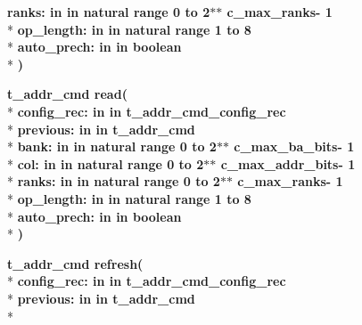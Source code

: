 \begin{DoxyCompactItemize}
{\bfseries \textcolor{vhdlchar}{ranks\+: }\textcolor{stringliteral}{in }\textcolor{vhdlchar}{in natural   range  0 to  2$\ast$$\ast$   c\+\_\+max\+\_\+ranks-\/ 1}}\\*
{\bfseries \textcolor{vhdlchar}{op\+\_\+length\+: }\textcolor{stringliteral}{in }\textcolor{vhdlchar}{in natural   range  1 to  8}}\\*
{\bfseries \textcolor{vhdlchar}{auto\+\_\+prech\+: }\textcolor{stringliteral}{in }\textcolor{vhdlchar}{in boolean}}\\*
{\bfseries  )} 
\item 
{\bfseries {\bfseries \textcolor{vhdlchar}{t\+\_\+addr\+\_\+cmd}\textcolor{vhdlchar}{ }}} {\bf read}{\bfseries  ( }\\*
{\bfseries \textcolor{vhdlchar}{config\+\_\+rec\+: }\textcolor{stringliteral}{in }\textcolor{vhdlchar}{in t\+\_\+addr\+\_\+cmd\+\_\+config\+\_\+rec}}\\*
{\bfseries \textcolor{vhdlchar}{previous\+: }\textcolor{stringliteral}{in }\textcolor{vhdlchar}{in t\+\_\+addr\+\_\+cmd}}\\*
{\bfseries \textcolor{vhdlchar}{bank\+: }\textcolor{stringliteral}{in }\textcolor{vhdlchar}{in natural   range  0 to  2$\ast$$\ast$   c\+\_\+max\+\_\+ba\+\_\+bits-\/ 1}}\\*
{\bfseries \textcolor{vhdlchar}{col\+: }\textcolor{stringliteral}{in }\textcolor{vhdlchar}{in natural   range  0 to  2$\ast$$\ast$   c\+\_\+max\+\_\+addr\+\_\+bits-\/ 1}}\\*
{\bfseries \textcolor{vhdlchar}{ranks\+: }\textcolor{stringliteral}{in }\textcolor{vhdlchar}{in natural   range  0 to  2$\ast$$\ast$   c\+\_\+max\+\_\+ranks-\/ 1}}\\*
{\bfseries \textcolor{vhdlchar}{op\+\_\+length\+: }\textcolor{stringliteral}{in }\textcolor{vhdlchar}{in natural   range  1 to  8}}\\*
{\bfseries \textcolor{vhdlchar}{auto\+\_\+prech\+: }\textcolor{stringliteral}{in }\textcolor{vhdlchar}{in boolean}}\\*
{\bfseries  )} 
\item 
{\bfseries {\bfseries \textcolor{vhdlchar}{t\+\_\+addr\+\_\+cmd}\textcolor{vhdlchar}{ }}} {\bf refresh}{\bfseries  ( }\\*
{\bfseries \textcolor{vhdlchar}{config\+\_\+rec\+: }\textcolor{stringliteral}{in }\textcolor{vhdlchar}{in t\+\_\+addr\+\_\+cmd\+\_\+config\+\_\+rec}}\\*
{\bfseries \textcolor{vhdlchar}{previous\+: }\textcolor{stringliteral}{in }\textcolor{vhdlchar}{in t\+\_\+addr\+\_\+cmd}}\\*

\end{DoxyCompactItemize}

